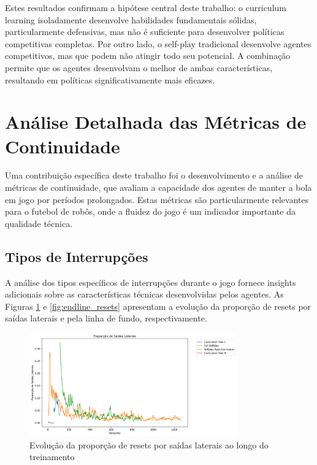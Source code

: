 Estes resultados confirmam a hipótese central deste trabalho: o curriculum learning isoladamente desenvolve habilidades fundamentais sólidas, particularmente defensivas, mas não é suficiente para desenvolver políticas competitivas completas. Por outro lado, o self-play tradicional desenvolve agentes competitivos, mas que podem não atingir todo seu potencial. A combinação permite que os agentes desenvolvam o melhor de ambas características, resultando em políticas significativamente mais eficazes.

\section{Análise Detalhada das Métricas de Continuidade}
\label{sec:analise_continuidade}

Uma contribuição específica deste trabalho foi o desenvolvimento e a análise de métricas de continuidade, que avaliam a capacidade dos agentes de manter a bola em jogo por períodos prolongados. Estas métricas são particularmente relevantes para o futebol de robôs, onde a fluidez do jogo é um indicador importante da qualidade técnica.

\subsection{Tipos de Interrupções}

A análise dos tipos específicos de interrupções durante o jogo fornece insights adicionais sobre as características técnicas desenvolvidas pelos agentes. As Figuras \ref{fig:lateral_resets} e \ref{fig:endline_resets} apresentam a evolução da proporção de resets por saídas laterais e pela linha de fundo, respectivamente.

\begin{figure}[H]
    \centering
    \includegraphics[width=0.8\textwidth]{fig/graficos_trabalho/graficos_experimentos/geral/custom_metricslateral_resets_ratio_mean.png}
    \caption{Evolução da proporção de resets por saídas laterais ao longo do treinamento}
    \label{fig:lateral_resets}
\end{figure}

